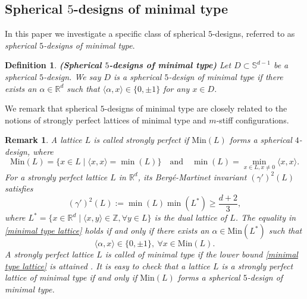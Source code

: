 \documentclass[11pt]{article}
\newtheorem{definition}{Definition}[section]
\newtheorem{remark}{Remark}[section]
\theoremstyle{definition}
\theoremstyle{remark}
\begin{document}
\subsection{Spherical $5$-designs of minimal type}

In this paper we investigate a specific class of spherical $5$-designs, referred to as {\it spherical $5$-designs of minimal type}. 

\begin{definition}{\bf (Spherical $5$-designs of minimal type)}
Let $D\subset\mathbb{S}^{d-1}$ be a spherical $5$-design.
We say $D$ is a spherical $5$-design of minimal type
if there exists an $\alpha\in \mathbb{R}^d$ such that $\langle \alpha,x\rangle\in\{0,\pm 1\}$ for any $x\in D$.
\end{definition}

We remark that spherical $5$-designs of minimal type are closely related to the notions of strongly perfect lattices of minimal type and $m$-stiff configurations. 

\begin{remark}\label{remark-strongly perfect lattices}
A lattice $L$ is called strongly perfect if $\mathrm{Min}(L)$ forms a spherical $4$-design, where
\begin{equation*}
\mathrm{Min}(L)=\{x\in L \mid \langle x,x\rangle=\min(L)\}
\quad\text{and}\quad 
\min(L)=\min_{x\in L,x\neq 0} \langle x,x\rangle.
\end{equation*}
For a strongly perfect lattice $L$ in $\mathbb{R}^d$,
its Berg\'e-Martinet invariant $(\gamma')^2(L)$ satisfies  
\begin{equation}\label{minimal type lattice}
(\gamma')^2(L):=\min(L)\min(L^*)\geq \frac{d+2}{3},	
\end{equation}
where $L^*=\{x\in\mathbb{R}^{d}\mid \langle x,y\rangle\in\mathbb{Z}, \forall y\in L\}$ is the dual lattice of $L$.
The equality in \eqref{minimal type lattice} holds if and only if there exists an $\alpha\in \mathrm{Min}(L^*)$ such that \cite[Theorem 10.4]{Ven01} 
\begin{equation*}
\langle \alpha,x\rangle\in\{0,\pm 1\}, \ \forall x\in \mathrm{Min}(L).
\end{equation*}
A strongly perfect lattice $L$ is called of minimal type if the lower bound \eqref{minimal type lattice} is attained \cite{Ven01,NV00,Mar13}.
It is easy to check that a lattice $L$ is a strongly perfect lattice of minimal type if and only if $\mathrm{Min}(L)$ forms a spherical $5$-design of minimal type.
	
\end{remark}
\end{document}

